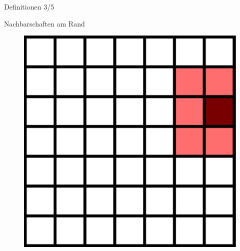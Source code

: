 \documentclass[aspectratio=169]{beamer}
\begin{document}
\begin{frame}{Definitionen 3/5}
\begin{multicols*}{2}
\begin{multicols*}{2}
      \end{multicols*}


      \vfill\null

    \end{multicols*}

  \end{frame}



  \begin{frame}{Nachbarschaften am Rand}


    \begin{multicols*}{5}

      \begin{figure}[H]
        \centering
        \includegraphics[width = 0.25 \textheight]{neighborhood_border_sol1.png}
      \end{figure}

      \vfill\null

      \centering{\Huge $\leftarrow$ \par}
      \vfill\null


\end{multicols*}
\end{frame}
\end{document}

